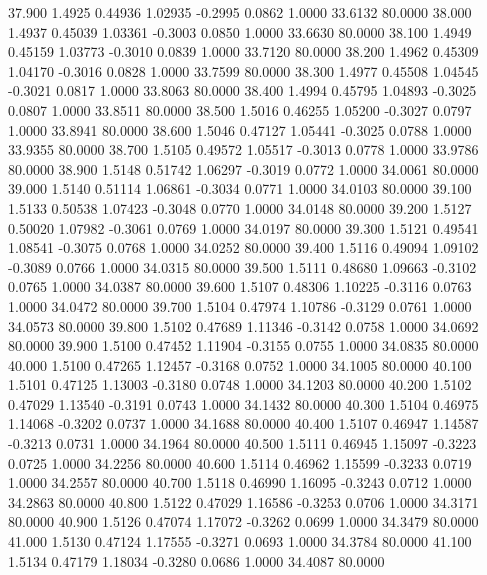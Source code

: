   37.900   1.4925   0.44936   1.02935  -0.2995   0.0862   1.0000  33.6132  80.0000
  38.000   1.4937   0.45039   1.03361  -0.3003   0.0850   1.0000  33.6630  80.0000
  38.100   1.4949   0.45159   1.03773  -0.3010   0.0839   1.0000  33.7120  80.0000
  38.200   1.4962   0.45309   1.04170  -0.3016   0.0828   1.0000  33.7599  80.0000
  38.300   1.4977   0.45508   1.04545  -0.3021   0.0817   1.0000  33.8063  80.0000
  38.400   1.4994   0.45795   1.04893  -0.3025   0.0807   1.0000  33.8511  80.0000
  38.500   1.5016   0.46255   1.05200  -0.3027   0.0797   1.0000  33.8941  80.0000
  38.600   1.5046   0.47127   1.05441  -0.3025   0.0788   1.0000  33.9355  80.0000
  38.700   1.5105   0.49572   1.05517  -0.3013   0.0778   1.0000  33.9786  80.0000
  38.900   1.5148   0.51742   1.06297  -0.3019   0.0772   1.0000  34.0061  80.0000
  39.000   1.5140   0.51114   1.06861  -0.3034   0.0771   1.0000  34.0103  80.0000
  39.100   1.5133   0.50538   1.07423  -0.3048   0.0770   1.0000  34.0148  80.0000
  39.200   1.5127   0.50020   1.07982  -0.3061   0.0769   1.0000  34.0197  80.0000
  39.300   1.5121   0.49541   1.08541  -0.3075   0.0768   1.0000  34.0252  80.0000
  39.400   1.5116   0.49094   1.09102  -0.3089   0.0766   1.0000  34.0315  80.0000
  39.500   1.5111   0.48680   1.09663  -0.3102   0.0765   1.0000  34.0387  80.0000
  39.600   1.5107   0.48306   1.10225  -0.3116   0.0763   1.0000  34.0472  80.0000
  39.700   1.5104   0.47974   1.10786  -0.3129   0.0761   1.0000  34.0573  80.0000
  39.800   1.5102   0.47689   1.11346  -0.3142   0.0758   1.0000  34.0692  80.0000
  39.900   1.5100   0.47452   1.11904  -0.3155   0.0755   1.0000  34.0835  80.0000
  40.000   1.5100   0.47265   1.12457  -0.3168   0.0752   1.0000  34.1005  80.0000
  40.100   1.5101   0.47125   1.13003  -0.3180   0.0748   1.0000  34.1203  80.0000
  40.200   1.5102   0.47029   1.13540  -0.3191   0.0743   1.0000  34.1432  80.0000
  40.300   1.5104   0.46975   1.14068  -0.3202   0.0737   1.0000  34.1688  80.0000
  40.400   1.5107   0.46947   1.14587  -0.3213   0.0731   1.0000  34.1964  80.0000
  40.500   1.5111   0.46945   1.15097  -0.3223   0.0725   1.0000  34.2256  80.0000
  40.600   1.5114   0.46962   1.15599  -0.3233   0.0719   1.0000  34.2557  80.0000
  40.700   1.5118   0.46990   1.16095  -0.3243   0.0712   1.0000  34.2863  80.0000
  40.800   1.5122   0.47029   1.16586  -0.3253   0.0706   1.0000  34.3171  80.0000
  40.900   1.5126   0.47074   1.17072  -0.3262   0.0699   1.0000  34.3479  80.0000
  41.000   1.5130   0.47124   1.17555  -0.3271   0.0693   1.0000  34.3784  80.0000
  41.100   1.5134   0.47179   1.18034  -0.3280   0.0686   1.0000  34.4087  80.0000
